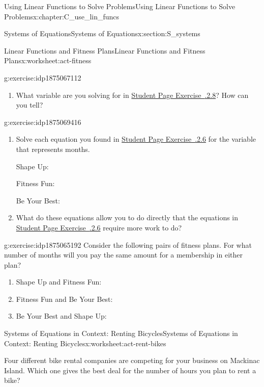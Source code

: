 \documentclass[oneside,10pt,]{book}
\newcommand{\xreffont}{\relax}
\numberwithin{equation}{chapter}
\begin{document}
\begin{chapterptx}{Using Linear Functions to Solve Problems}{}{Using Linear Functions to Solve Problems}{}{}{x:chapter:C_use_lin_funcs}
\begin{sectionptx}{Systems of Equations}{}{Systems of Equations}{}{}{x:section:S_systems}
\begin{worksheet-subsection}{Linear Functions and Fitness Plans}{}{Linear Functions and Fitness Plans}{}{}{x:worksheet:act-fitness}
\begin{divisionexercise}{9}{}{}{g:exercise:idp1875067112}
\begin{enumerate}[font=\bfseries,label=(\alph*),ref=\alph*]
\item{}What variable are you solving for in \hyperlink{x:exercise:exer-fitness-summer}{Student Page Exercise~{\xreffont 3.5.2.8}}? How can you tell?%
\end{enumerate}
\end{divisionexercise}%
\begin{divisionexercise}{10}{}{}{g:exercise:idp1875069416}%
\begin{enumerate}[font=\bfseries,label=(\alph*),ref=\alph*]
\item{}Solve each equation you found in \hyperlink{x:exercise:exer-fitness-eq}{Student Page Exercise~{\xreffont 3.5.2.6}} for the variable that represents months.%
\par
Shape Up:%
\par
Fitness Fun:%
\par
Be Your Best:%
\item{}What do these equations allow you to do directly that the equations in \hyperlink{x:exercise:exer-fitness-eq}{Student Page Exercise~{\xreffont 3.5.2.6}} require more work to do?%
\end{enumerate}
\end{divisionexercise}%
\begin{divisionexercise}{11}{}{}{g:exercise:idp1875065192}%
Consider the following pairs of fitness plans. For what number of months will you pay the same amount for a membership in either plan?%
\begin{enumerate}[font=\bfseries,label=(\alph*),ref=\alph*]
\item{}Shape Up and Fitness Fun:%
\item{}Fitness Fun and Be Your Best:%
\item{}Be Your Best and Shape Up:%
\end{enumerate}
\end{divisionexercise}%
\end{worksheet-subsection}
\restoregeometry
%
%
\typeout{************************************************}
\typeout{************************************************}
%
\begin{worksheet-subsection}{Systems of Equations in Context: Renting Bicycles}{}{Systems of Equations in Context: Renting Bicycles}{}{}{x:worksheet:act-rent-bikes}
\begin{introduction}{}%
Four different bike rental companies are competing for your business on Mackinac Island. Which one gives the best deal for the number of hours you plan to rent a bike?%

\end{introduction}
\end{worksheet-subsection}
\end{sectionptx}
\end{chapterptx}
\end{document}
